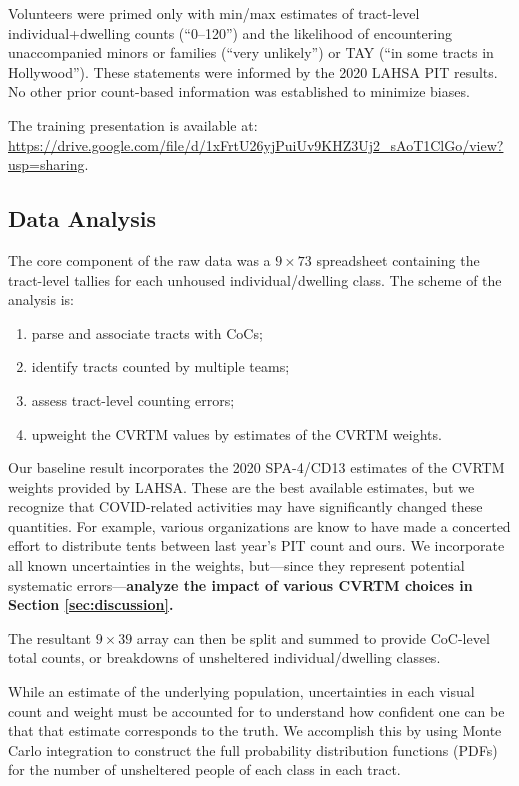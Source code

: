 \documentclass[11pt,twocolumn]{article}
\def\bfr{\bf\color{red}}
\begin{document}
Volunteers were primed only with min/max estimates of tract-level individual+dwelling counts 
(``0--120'') and the likelihood of encountering unaccompanied minors or families (``very unlikely'')
or TAY (``in some tracts in Hollywood''). These statements were informed by the 2020 LAHSA PIT 
results. No other prior count-based information was established to minimize biases.

The training presentation is available at: \url{https://drive.google.com/file/d/1xFrtU26yjPuiUv9KHZ3Uj2_sAoT1ClGo/view?usp=sharing}.

\subsection{Data Analysis}
\label{sec:analysis}

The core component of the raw data was a $9\times73$ spreadsheet containing the
tract-level tallies for each unhoused individual/dwelling class. The scheme of the analysis is:
\begin{enumerate}
	\item parse and associate tracts with CoCs;
	\item identify tracts counted by multiple teams;
	\item assess tract-level counting errors;
	\item upweight the CVRTM values by estimates of the CVRTM weights.
\end{enumerate}

Our baseline result incorporates the 2020 SPA-4/CD13 estimates of the CVRTM weights provided
by LAHSA. These are the best available estimates, but we recognize that COVID-related activities 
may have significantly changed these quantities. For example, various organizations are know to
have made a concerted effort to distribute tents between last year's PIT count and ours. We 
incorporate all known uncertainties in the weights, but---since they represent potential systematic 
errors---{\bfr analyze the impact of various CVRTM choices in Section \ref{sec:discussion}.}

The resultant $9\times39$ array can then be split and summed to provide CoC-level total counts, 
or breakdowns of unsheltered individual/dwelling classes.

While an estimate of the underlying population, uncertainties in each visual count and weight 
must be accounted for to understand how confident one can be that that estimate corresponds to
the truth. We accomplish this by using Monte Carlo integration to construct the full probability
distribution functions (PDFs) for the number of unsheltered people of each class in each tract.
\end{document}
